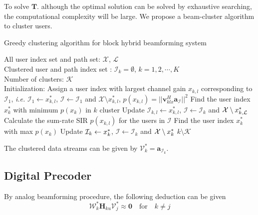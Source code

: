 \documentclass[conference]{IEEEtran}
\begin{document}
To solve $\bm{T}$. although the optimal solution can be solved by exhaustive searching, the computational complexity will be large. We propose a beam-cluster algorithm to cluster users.
\begin{algorithm}[h] 		
	\caption{Greedy clustering algorithm for block hybrid beamforming system}
	\label{beam_cluster}
	\begin{algorithmic}
		\REQUIRE  \quad
		\STATE	All user index set and path set: $\mathcal{X}$, $\mathcal{L}$\\
		\STATE  Clustered user and path index set : $\mathcal{I}_k=\emptyset$, $k=1,2,\cdots, K$\\
		\STATE  Number of clusters: $\mathcal{K}$\\
		\ENSURE   	
		\STATE Initialization: Assign a user index with largest channel gain $x_{k,l}$ corresponding to ${\mathcal I}_1$, {\em i.e.} $\mathcal{I}_1 \leftarrow  x^*_{k,l}$,  $\bm{\mathcal{I}} \leftarrow \mathcal{I}_1$ and ${\mathcal X}\setminus x_{k,l}^*$, 
		\STATE $p(x_{k,l}) = ||\bm{v}_{klx}^H \bm{a}_{\bm{\mathcal{I}}}||^2$
		\ENDFOR
		\STATE Find the user index $x_k^*$ with minimum $p(x_k)$ in $k$ cluster
		\STATE Update $\mathcal{I}_{k,l}\leftarrow x_{k,l}^*$, $\bm{\mathcal{I}}\leftarrow \mathcal{I}_k$ and  ${\cal X}\setminus x_{k,\mathcal{L}}^*$
		\ENDWHILE
		\STATE  Calculate the sum-rate SIR $p(x_{k,l})$ for the users in $\bm{\mathcal{I}}$
		\ENDFOR
		\STATE Find the user index $x_k^*$ with max $p(x_k)$								
		\STATE	Update ${\cal I}_k \leftarrow  x_k^*$, $\bm{\mathcal{I}}\leftarrow \mathcal{I}_k$ and ${\cal X}\setminus x_k^*$	
		\STATE $k \setminus {\mathcal{K}}$
		\ENDIF
		\ENDFOR	
	\end{algorithmic}
\end{algorithm}

The clustered data streams can be given by $\bm{\mathcal{V}}^*_k = \bm{\bm{a}}_{\mathcal{I}_k}$.


\subsection{Digital Precoder}
By analog beamforming procedure, the following deduction can be given
\begin{equation}\label{approx}
\bm{\mathcal{W}}^*_{k}\bm{H}_{ku}\bm{\mathcal{V}}^*_{j} \approx \bm{0} \quad \text{for} \quad k \neq j
\end{equation}
\end{document}
